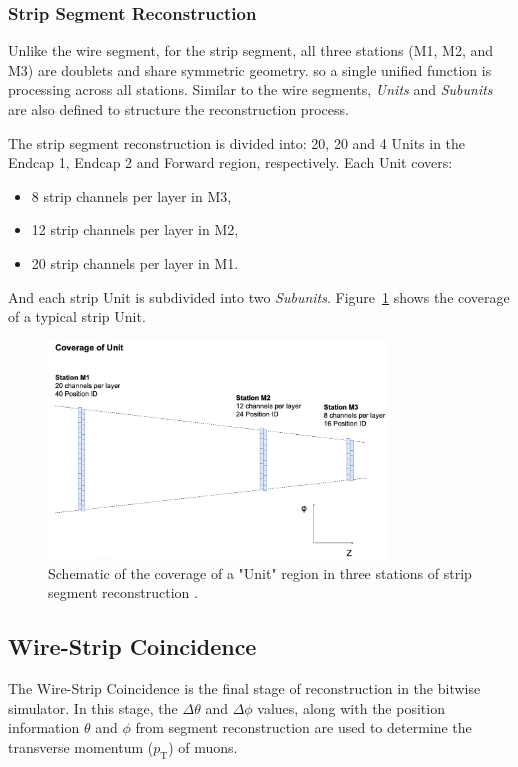 \subsubsection{Strip Segment Reconstruction}

Unlike the wire segment, for the strip segment, all three stations (M1, M2, and M3) are doublets and share symmetric geometry. so a single unified function is processing across all stations. Similar to the wire segments, \textit{Units} and \textit{Subunits} are also defined to structure the reconstruction process.

The strip segment reconstruction is divided into: 20, 20 and 4 Units in the Endcap 1, Endcap 2 and Forward region, respectively. Each Unit covers:
\begin{itemize}
  \item 8 strip channels per layer in M3,
  \item 12 strip channels per layer in M2,
  \item 20 strip channels per layer in M1.
\end{itemize}
And each strip Unit is subdivided into two \textit{Subunits}. Figure~\ref{fig:strip_unit} shows the coverage of a typical strip Unit.

\begin{figure}[htbp]
  \centering
  \includegraphics[width=0.8\textwidth]{figs/chapter5/strip_unit.png}
  \caption{Schematic of the coverage of a "Unit" region in three stations of strip segment reconstruction \cite{EndcapSLPDR}.}
  \label{fig:strip_unit}
\end{figure}

\subsection{Wire-Strip Coincidence} \label{subsec:WireStripCoin}
The Wire-Strip Coincidence is the final stage of reconstruction in the bitwise simulator. In this stage, the $\Delta\theta$ and $\Delta\phi$ values, along with the position information $\theta$ and $\phi$ from segment reconstruction are used to determine the transverse momentum ($p_{\mathrm{T}}$) of muons.


